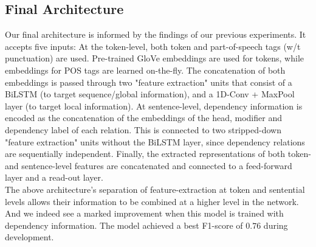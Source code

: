 \documentclass[11pt]{article}
\begin{document}
\subsection{Final Architecture}
Our final architecture is informed by the findings of our previous experiments. It accepts five inputs: At the token-level, both  token
and part-of-speech tags (w/t punctuation) are used. Pre-trained GloVe embeddings are used for tokens, while embeddings for POS tags
are learned on-the-fly. The concatenation of both embeddings is passed through two "feature extraction" units that consist of a
BiLSTM (to target sequence/global information), and a 1D-Conv + MaxPool layer (to target local information). At sentence-level,
dependency information is encoded as the concatenation of the embeddings of the head, modifier and dependency label of each relation.
This is connected to two stripped-down "feature extraction" units without the BiLSTM layer, since dependency relations are
sequentially independent. Finally, the extracted representations of both token- and sentence-level features are concatenated and
connected to a feed-forward layer and a read-out layer.\\

The above architecture's separation of feature-extraction at token and sentential levels allows their information to be combined
at a higher level in the network. And we indeed see a marked improvement when this model is trained with dependency information.
The model achieved a best F1-score of $0.76$ during development.
\end{document}
